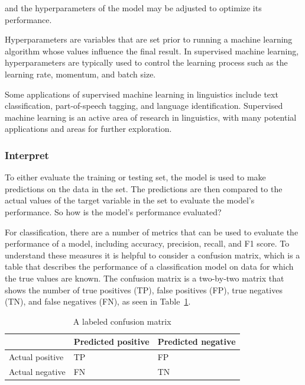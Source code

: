 \documentclass[
  letterpaper,
]{scrbook}
\begin{document}
and the hyperparameters of the model may be adjusted to optimize its
performance.

Hyperparameters are variables that are set prior to running a machine
learning algorithm whose values influence the final result. In
supervised machine learning, hyperparameters are typically used to
control the learning process such as the learning rate, momentum, and
batch size.

Some applications of supervised machine learning in linguistics include
text classification, part-of-speech tagging, and language
identification. Supervised machine learning is an active area of
research in linguistics, with many potential applications and areas for
further exploration.

\hypertarget{pda-interpret}{%
\subsubsection{Interpret}\label{pda-interpret}}

To either evaluate the training or testing set, the model is used to
make predictions on the data in the set. The predictions are then
compared to the actual values of the target variable in the set to
evaluate the model's performance. So how is the model's performance
evaluated?

For classification, there are a number of metrics that can be used to
evaluate the performance of a model, including accuracy, precision,
recall, and F1 score. To understand these measures it is helpful to
consider a confusion matrix, which is a table that describes the
performance of a classification model on data for which the true values
are known. The confusion matrix is a two-by-two matrix that shows the
number of true positives (TP), false positives (FP), true negatives
(TN), and false negatives (FN), as seen in
Table~\ref{tbl-pda-confusion-matrix}.

\hypertarget{tbl-pda-confusion-matrix}{}
\begin{table}
\caption{\label{tbl-pda-confusion-matrix}A labeled confusion matrix }\tabularnewline

\centering
\begin{tabular}{l|l|l}
\hline
  & Predicted positive & Predicted negative\\
\hline
Actual positive & TP & FP\\
\hline
Actual negative & FN & TN\\
\hline
\end{tabular}
\end{table}
\end{document}
